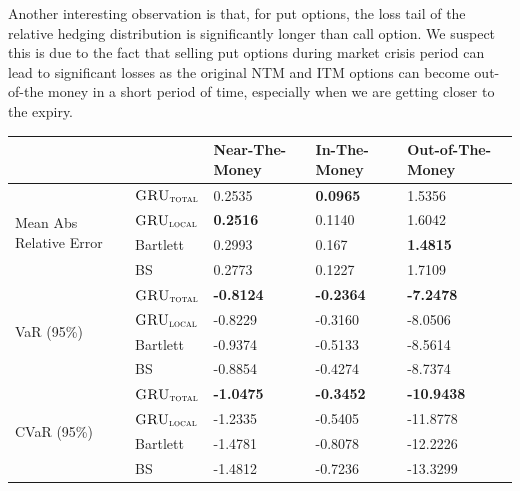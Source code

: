 \documentclass[letterpaper,12pt,titlepage,oneside,final]{book}
\numberwithin{equation}{section}
\theoremstyle{definition}
\newcommand{\modelT}{\textsc{GRU}_{\textsc{total}}}
\newcommand{\modelL}{\textsc{GRU}_{\textsc{local}}}
\begin{document}
Another interesting observation is that, for put options, the loss tail of the relative hedging distribution is significantly longer than call option. We suspect this is due to the fact that selling put options during market crisis period can lead to significant losses as the original NTM and ITM options can become out-of-the money in a short period of time, especially when we are getting closer to the expiry.
\begin{table}[htp!]
	\centering
	\begin{tabular}{ll|l|l|l|}
		\cline{3-5}
		&          & Near-The-Money   & In-The-Money     & Out-of-The-Money  \\ \hline
		\multicolumn{1}{|l|}{\multirow{4}{*}{Mean Abs Relative Error}} & $\modelT$    & 0.2535           & \textbf{0.0965}  & 1.5356   \\ 
		\multicolumn{1}{|l|}{}                                & $\modelL$    & \textbf{0.2516}  & 0.1140           & 1.6042             \\ 
		\multicolumn{1}{|l|}{}                                & Bartlett     & 0.2993 			& 0.167  		   & \textbf{1.4815}       \\ 
		\multicolumn{1}{|l|}{}                                & BS       	 & 0.2773 		    & 0.1227 		   & 1.7109            \\ 
		\hline
		\multicolumn{1}{|l|}{\multirow{4}{*}{VaR (95\%)}}     & $\modelT$    & \textbf{-0.8124} & \textbf{-0.2364} & \textbf{-7.2478}  \\ 
		\multicolumn{1}{|l|}{}                                & $\modelL$    & -0.8229          & -0.3160          & -8.0506           \\ 
		\multicolumn{1}{|l|}{}                                & Bartlett 	 & -0.9374 			& -0.5133 		   &-8.5614           \\  
		\multicolumn{1}{|l|}{}                                & BS       	 & -0.8854 			& -0.4274 		   &-8.7374           \\ 
		\hline
		\multicolumn{1}{|l|}{\multirow{4}{*}{CVaR (95\%)}}    & $\modelT$    & \textbf{-1.0475} & \textbf{-0.3452} & \textbf{-10.9438} \\ 
		\multicolumn{1}{|l|}{}                                & $\modelL$    & -1.2335          & -0.5405          & -11.8778          \\  
		\multicolumn{1}{|l|}{}                                & Bartlett 	 & -1.4781  		&-0.8078 		   &-12.2226          \\  
		\multicolumn{1}{|l|}{}                                & BS       	 &  -1.4812  		&-0.7236 		   &-13.3299          \\ 

\end{tabular}
\end{table}
\end{document}
